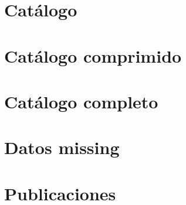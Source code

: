 \section{Catálogo}
\label{sec:clasificacion:catalogo}










\section{Catálogo comprimido}
\label{sec:clasificacion:catalogo-comprimido}










\section{Catálogo completo}
\label{sec:clasificacion:catalogo-completo}







\section{Datos missing}
\label{sec:clasificacion:datos-missing}






\section{Publicaciones}
\label{sec:clasificacion:publicaciones}







